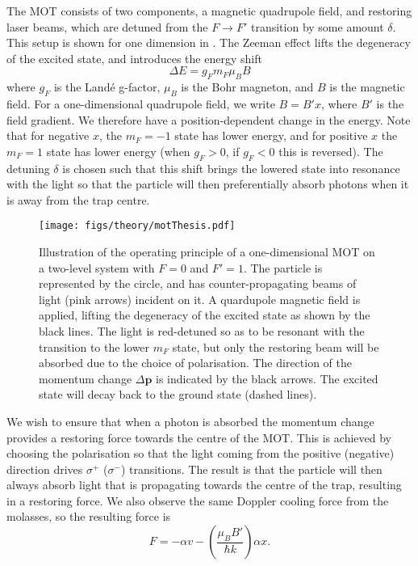 The MOT consists of two components, a magnetic quadrupole field, and restoring
laser beams, which are detuned from the $F\rightarrow F'$ transition by some
amount $\delta$. This setup is shown for one dimension in
. The Zeeman effect lifts the degeneracy of the excited state, and
introduces the energy shift~\cite{Binney}
%
\begin{equation}
  \Delta E = g_F m_F \mu_B B
  \label{theory:eqn:zeeman}
\end{equation}
%
where $g_F$ is the Land\'e g-factor, $\mu_B$ is the Bohr magneton, and $B$ is
the magnetic field. For a one-dimensional quadrupole field, we write $B=B'x$,
where $B'$ is the field gradient. We therefore have a position-dependent change
in the energy. Note that for negative $x$, the $m_F=-1$ state has lower energy,
and for positive $x$ the $m_F=1$ state has lower energy (when $g_F>0$, if
$g_F<0$ this is reversed).
%
The detuning $\delta$ is chosen such that this shift brings the lowered state
into resonance with the light so that the particle will then preferentially
absorb photons when it is away from the trap centre.

\begin{figure}[ht]
  \centering
  \texttt{[image: figs/theory/motThesis.pdf]}
  \caption[MOT operating principle]{
    Illustration of the operating principle of a one-dimensional MOT on
    a two-level system with $F=0$ and $F'=1$. The particle is represented by
    the circle, and has counter-propagating beams of light (pink arrows)
    incident on it. A quardupole magnetic field is applied, lifting the
    degeneracy of the excited state as shown by the black lines. The light is
    red-detuned so as to be resonant with the transition to the lower $m_F$
    state, but only the restoring beam will be absorbed due to the choice of
    polarisation. The direction of the momentum change $\Delta\mathbf{p}$ is
    indicated by the black arrows. The excited state will decay back to the
    ground state (dashed lines).
  }
  \label{theory:fig:MOT}
\end{figure}

We wish to ensure that when a photon is absorbed the momentum change provides a
restoring force towards the centre of the MOT. This is achieved by choosing the
polarisation  so that the light coming from the positive (negative) direction
drives $\sigma^+$ ($\sigma^-$) transitions. The result is
that the particle will then always absorb light that is propagating towards the
centre of the trap, resulting in a restoring force. We also observe the same
Doppler cooling force from the molasses, so the resulting force is
%
\begin{equation}
  F = - \alpha v - \left(\frac{\mu_B B'}{\hbar k}\right)\alpha x.
\end{equation}

